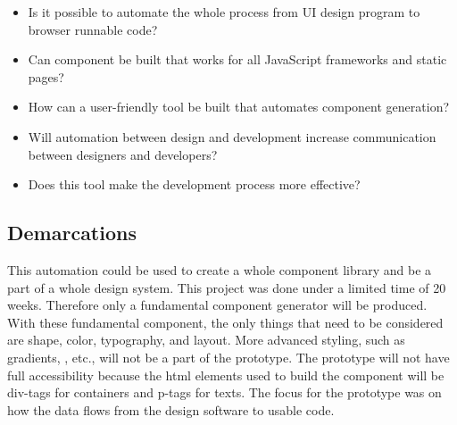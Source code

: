 \begin{itemize}
  \item Is it possible to automate the whole process from UI design program to browser runnable code? 
  \item Can \gls{component} be built that works for all JavaScript frameworks and static pages? 
  \item How can a user-friendly tool be built that automates component generation? 
  \item Will automation between design and development increase communication between designers and developers? 
  \item Does this tool make the development process more effective?
\end{itemize}

\subsection{Demarcations}%
\label{sub:Demarcations}
This automation could be used to create a whole component library and be a part of a whole design system. This project was done under a limited time of 20 weeks. Therefore only a fundamental component generator will be produced. With these fundamental \gls{component}, the only things that need to be considered are shape, color, typography, and layout. More advanced styling, such as gradients, , etc., will not be a part of the prototype. The prototype will not have full accessibility because the \acrshort{html} elements used to build the \gls{component} will be \glspl{div-tag} for containers and \glspl{p-tag} for texts. The focus for the prototype was on how the data flows from the design software to usable code.




